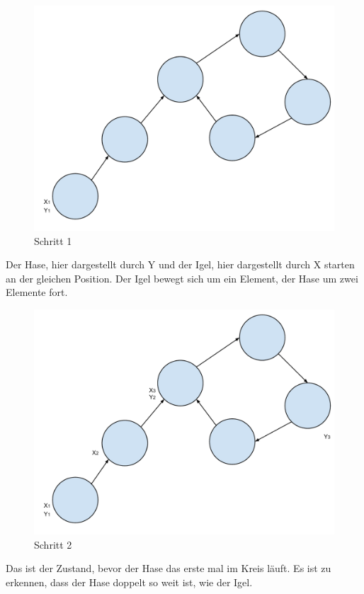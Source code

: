     \begin{figure}[!h] 
    	\centering
    	\includegraphics[width=0.7\linewidth]{Rho1}
    	\caption{Schritt 1}
    	\label{fig:Rho1)}
    \end{figure}
    Der Hase, hier dargestellt durch Y und der Igel, hier dargestellt durch X starten an der gleichen Position. Der Igel bewegt sich um ein Element, der Hase um zwei Elemente fort.\\

  \begin{figure}[!h] 
  	\centering
  	\includegraphics[width=0.7\linewidth]{Rho2}
  	\caption{Schritt 2}
  	\label{fig:Rho2)}
  \end{figure}
  
  Das ist der Zustand, bevor der Hase das erste mal im Kreis l\"auft. Es ist zu erkennen, dass der Hase doppelt so weit ist, wie der Igel.
  

